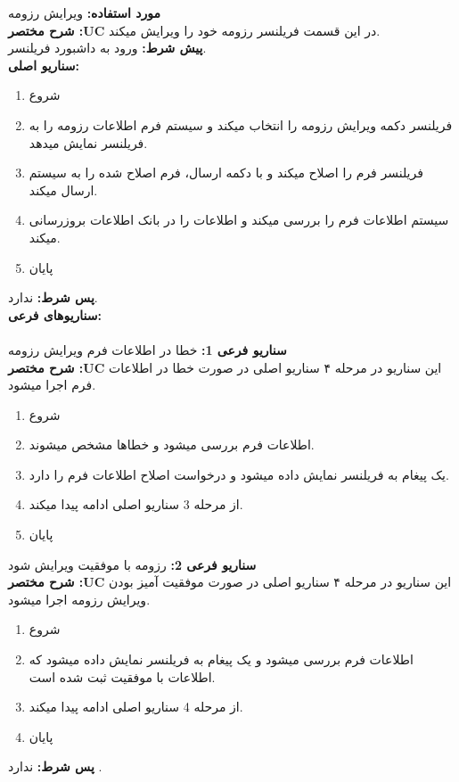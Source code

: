 \documentclass[20pt,a5paper]{report}
\begin{document}
\noindent \textbf{مورد استفاده:}
ویرایش رزومه
\\
\textbf{شرح مختصر :UC}
در این قسمت فریلنسر رزومه خود را ویرایش میکند.
\\
\textbf{پيش شرط:}
ورود به داشبورد فریلنسر.
\\
\textbf{سناريو اصلی:}
\begin{enumerate}
\item
شروع
\item
فریلنسر دکمه ویرایش رزومه را انتخاب میکند و سیستم فرم اطلاعات رزومه را به فریلنسر نمایش میدهد.
\item
فریلنسر فرم را اصلاح میکند و با دکمه ارسال، فرم اصلاح شده را به سیستم ارسال میکند.
\item
سیستم اطلاعات فرم را بررسی میکند و اطلاعات را در بانک اطلاعات بروزرسانی میکند.
\item
پایان
\end{enumerate}
\textbf{پس شرط:}
ندارد.
\\
\textbf{سناريوهای فرعی:}
\\ \\
\textbf{سناريو فرعی 1:}
خطا در اطلاعات فرم ویرایش رزومه
\\
\textbf{شرح مختصر :UC}
این سناریو در مرحله ۴ سناریو اصلی در صورت خطا در اطلاعات فرم اجرا میشود.
\begin{enumerate}
\item
شروع
\item
اطلاعات فرم بررسی میشود و خطاها مشخص میشوند.
\item
یک پیغام به فریلنسر نمایش داده میشود و درخواست اصلاح اطلاعات فرم را دارد.
\item
از مرحله 3 سناریو اصلی ادامه پیدا میکند.
\item
پایان
\end{enumerate}
\textbf{سناريو فرعی 2:}
رزومه با موفقیت ویرایش شود
\\
\textbf{شرح مختصر :UC}
این سناریو در مرحله ۴ سناریو اصلی در صورت موفقیت آمیز بودن ویرایش رزومه اجرا میشود.
\begin{enumerate}
\item
شروع
\item
اطلاعات فرم بررسی میشود و یک پیغام به فریلنسر نمایش داده میشود که اطلاعات با موفقیت ثبت شده است.
\item
از مرحله 4 سناریو اصلی ادامه پیدا میکند.
\item
پایان
\end{enumerate}

\textbf{پس شرط:}
ندارد .


\centering
\vfill
\lr{\LaTeX}
\end{document}
